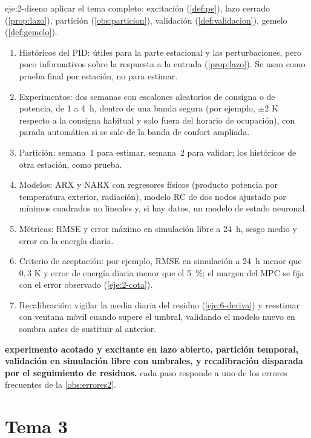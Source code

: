 \begin{solucion}{eje:2-diseno}
\planteamiento aplicar el tema completo: excitación (\cref{def:pe}), lazo cerrado (\cref{prop:lazo}), partición (\cref{obs:particion}), validación (\cref{def:validacion}), gemelo (\cref{def:gemelo}).
\pasos
\begin{enumerate}[label=\arabic*.]
  \item Históricos del PID: útiles para la parte estacional y las perturbaciones, pero poco informativos sobre la respuesta a la entrada (\cref{prop:lazo}). Se usan como prueba final por estación, no para estimar.
  \item Experimentos: dos semanas con escalones aleatorios de consigna o de potencia, de 1 a 4~h, dentro de una banda segura (por ejemplo, $\pm2$ K respecto a la consigna habitual y solo fuera del horario de ocupación), con parada automática si se sale de la banda de confort ampliada.
  \item Partición: semana~1 para estimar, semana~2 para validar; los históricos de otra estación, como prueba.
  \item Modelos: ARX y NARX con regresores físicos (producto potencia por temperatura exterior, radiación), modelo RC de dos nodos ajustado por mínimos cuadrados no lineales y, si hay datos, un modelo de estado neuronal.
  \item Métricas: RMSE y error máximo en simulación libre a 24~h, sesgo medio y error en la energía diaria.
  \item Criterio de aceptación: por ejemplo, RMSE en simulación a 24~h menor que $0{,}3$ K y error de energía diaria menor que el 5~\%; el margen del MPC se fija con el error observado (\cref{eje:2-cota}).
  \item Recalibración: vigilar la media diaria del residuo (\cref{eje:6-deriva}) y reestimar con ventana móvil cuando supere el umbral, validando el modelo nuevo en sombra antes de sustituir al anterior.
\end{enumerate}
\resultado \textbf{experimento acotado y excitante en lazo abierto, partición temporal, validación en simulación libre con umbrales, y recalibración disparada por el seguimiento de residuos.}
\comprobacion cada paso responde a uno de los errores frecuentes de la \cref{obs:errores2}.
\end{solucion}

\section{Tema 3}

